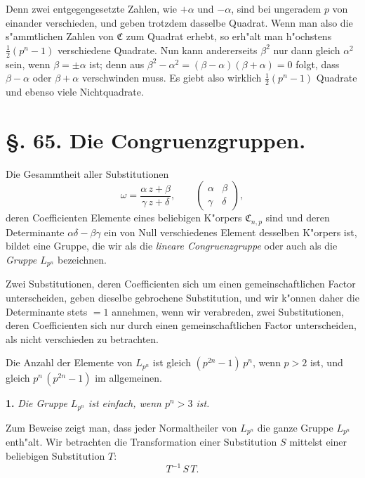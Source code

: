 \documentclass[12pt,a4paper]{article}
\theoremstyle{plain}
\theoremstyle{definition}
\theoremstyle{remark}
\begin{document}
Denn zwei entgegengesetzte Zahlen, wie $+\alpha$ und $-\alpha$, sind bei ungeradem $p$ von einander verschieden, und geben trotzdem dasselbe Quadrat. Wenn man also die s"ammtlichen Zahlen von $\mathfrak{C}$ zum Quadrat erhebt, so erh"alt man h"ochstens $\frac{1}{2}(p^{n} - 1)$ verschiedene Quadrate. Nun kann andererseits $\beta^{2}$ nur dann gleich $\alpha^{2}$ sein, wenn $\beta = \pm\alpha$ ist; denn aus $\beta^{2} - \alpha^{2} = (\beta - \alpha)(\beta + \alpha) = 0$ folgt, dass $\beta - \alpha$ oder $\beta + \alpha$ verschwinden muss. Es giebt also wirklich $\frac{1}{2}(p^{n} - 1)$ Quadrate und ebenso viele Nichtquadrate.

\section*{\S. 65. Die Congruenzgruppen.}

Die Gesammtheit aller Substitutionen
\begin{equation}\tag{1}
\omega = \frac{\alpha\,z + \beta}{\gamma\,z + \delta},\qquad
\begin{pmatrix} \alpha & \beta \\ \gamma & \delta \end{pmatrix},
\end{equation}
deren Coefficienten Elemente eines beliebigen K"orpers $\mathfrak{C}_{n,p}$ sind und deren Determinante $\alpha\delta - \beta\gamma$ ein von Null verschiedenes Element desselben K"orpers ist, bildet eine Gruppe, die wir als die \emph{lineare Congruenzgruppe} oder auch als die \emph{Gruppe $L_{p^{n}}$} bezeichnen.

Zwei Substitutionen, deren Coefficienten sich um einen gemeinschaftlichen Factor unterscheiden, geben dieselbe gebrochene Substitution, und wir k"onnen daher die Determinante stets $= 1$ annehmen, wenn wir verabreden, zwei Substitutionen, deren Coefficienten sich nur durch einen gemeinschaftlichen Factor unterscheiden, als nicht verschieden zu betrachten.

Die Anzahl der Elemente von $L_{p^{n}}$ ist gleich $(p^{2n} - 1)\,p^{n}$, wenn $p > 2$ ist, und gleich $p^{n}\,(p^{2n} - 1)$ im allgemeinen.

\medskip\noindent\textbf{1.} \emph{Die Gruppe $L_{p^{n}}$ ist einfach, wenn $p^{n} > 3$ ist.}

\smallskip
Zum Beweise zeigt man, dass jeder Normaltheiler von $L_{p^{n}}$ die ganze Gruppe $L_{p^{n}}$ enth"alt. Wir betrachten die Transformation einer Substitution $S$ mittelst einer beliebigen Substitution $T$:
\begin{equation}\tag{2}
T^{-1}\,S\,T.
\end{equation}
\end{document}
